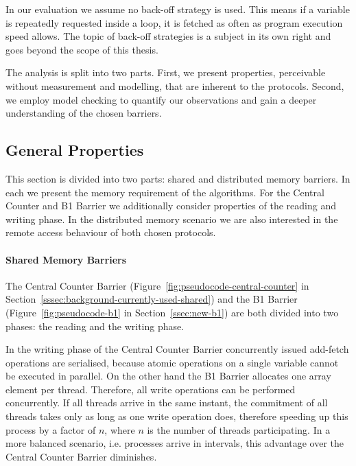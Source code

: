 \documentclass[a4paper, 10pt]{article}
\begin{document}
In our evaluation we assume no back-off strategy is used. This means if a variable is repeatedly requested inside a loop, it is fetched as often as program execution speed allows. The topic of back-off strategies is a subject in its own right and goes beyond the scope of this thesis.

The analysis is split into two parts. First, we present properties, perceivable without measurement and modelling, that are inherent to the protocols. Second, we employ model checking to quantify our observations and gain a deeper understanding of the chosen barriers.

\subsection{General Properties}
\label{sssec:analysis-general}
This section is divided into two parts: shared and distributed memory barriers.
In each we present the memory requirement of the algorithms.
For the Central Counter and B1 Barrier we additionally consider properties of the reading and writing phase.
In the distributed memory scenario we are also interested in the remote access behaviour of both chosen protocols.

\paragraph{Shared Memory Barriers}
\label{sssec:analysis-general-shared}

The Central Counter Barrier (Figure~\ref{fig:pseudocode-central-counter} in Section~\ref{sssec:background-currently-used-shared}) and the B1 Barrier (Figure~\ref{fig:pseudocode-b1} in Section~\ref{ssec:new-b1}) are both divided into two phases: the reading and the writing phase.

In the writing phase of the Central Counter Barrier concurrently issued add-fetch operations are serialised, because atomic operations on a single variable cannot be executed in parallel. On the other hand the B1 Barrier allocates one array element per thread. Therefore, all write operations can be performed concurrently. If all threads arrive in the same instant, the commitment of all threads takes only as long as one write operation does, therefore speeding up this process by a factor of $n$, where $n$ is the number of threads participating. In a more balanced scenario, i.e. processes arrive in intervals, this advantage over the Central Counter Barrier diminishes.
\end{document}
